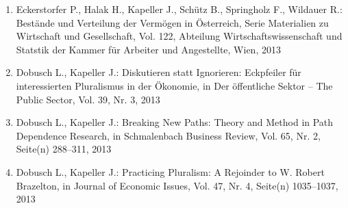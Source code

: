 \begin{enumerate}
	 \item Eckerstorfer P., Halak H., Kapeller J., Schütz B., Springholz F., Wildauer R.: Bestände und Verteilung der Vermögen in Österreich, Serie Materialien zu Wirtschaft und Gesellschaft, Vol. 122, Abteilung Wirtschaftswissenschaft und Statstik der Kammer für Arbeiter und Angestellte, Wien, 2013
	 \item Dobusch L., Kapeller J.: Diskutieren statt Ignorieren: Eckpfeiler für interessierten Pluralismus in der Ökonomie, in Der öffentliche Sektor -- The Public Sector, Vol. 39, Nr. 3, 2013
	 \item Dobusch L., Kapeller J.: Breaking New Paths: Theory and Method in Path Dependence Research, in Schmalenbach Business Review, Vol. 65, Nr. 2, Seite(n) 288--311, 2013
	 \item Dobusch L., Kapeller J.: Practicing Pluralism: A Rejoinder to W. Robert Brazelton, in Journal of Economic Issues, Vol. 47, Nr. 4, Seite(n) 1035--1037, 2013
\end{enumerate}
